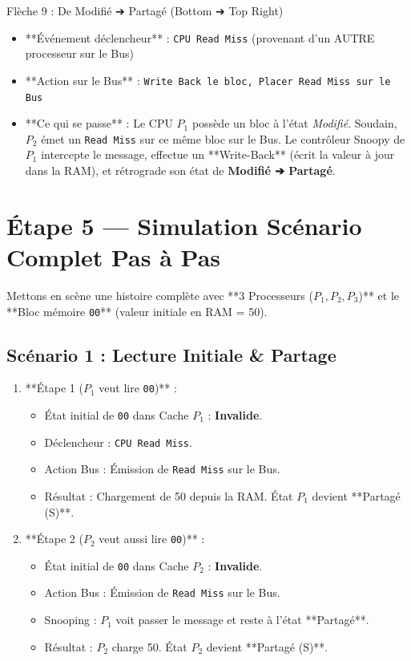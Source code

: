 \documentclass[12pt,a4paper]{article}
\begin{document}
\begin{transitionbox}{Flèche 9 : De Modifié ➔ Partagé (Bottom ➔ Top Right)}
\begin{itemize}
    \item **Événement déclencheur** : \texttt{CPU Read Miss} (provenant d'un AUTRE processeur sur le Bus)
    \item **Action sur le Bus** : \texttt{Write Back le bloc, Placer Read Miss sur le Bus}
    \item **Ce qui se passe** : Le CPU $P_1$ possède un bloc à l'état \textit{Modifié}. Soudain, $P_2$ émet un \texttt{Read Miss} sur ce même bloc sur le Bus. Le contrôleur Snoopy de $P_1$ intercepte le message, effectue un **Write-Back** (écrit la valeur à jour dans la RAM), et rétrograde son état de \textbf{Modifié ➔ Partagé}.
\end{itemize}
\end{transitionbox}

\newpage
\section{Étape 5 — Simulation Scénario Complet Pas à Pas}

Mettons en scène une histoire complète avec **3 Processeurs ($P_1, P_2, P_3$)** et le **Bloc mémoire \texttt{00}** (valeur initiale en RAM = 50).

\subsection{Scénario 1 : Lecture Initiale \& Partage}
\begin{enumerate}
    \item **Étape 1 ($P_1$ veut lire \texttt{00})** :
    \begin{itemize}
        \item État initial de \texttt{00} dans Cache $P_1$ : \textbf{Invalide}.
        \item Déclencheur : \texttt{CPU Read Miss}.
        \item Action Bus : Émission de \texttt{Read Miss} sur le Bus.
        \item Résultat : Chargement de 50 depuis la RAM. État $P_1$ devient **Partagé (S)**.
    \end{itemize}
    
    \item **Étape 2 ($P_2$ veut aussi lire \texttt{00})** :
    \begin{itemize}
        \item État initial de \texttt{00} dans Cache $P_2$ : \textbf{Invalide}.
        \item Action Bus : Émission de \texttt{Read Miss} sur le Bus.
        \item Snooping : $P_1$ voit passer le message et reste à l'état **Partagé**.
        \item Résultat : $P_2$ charge 50. État $P_2$ devient **Partagé (S)**.
    \end{itemize}
\end{enumerate}
\end{document}
